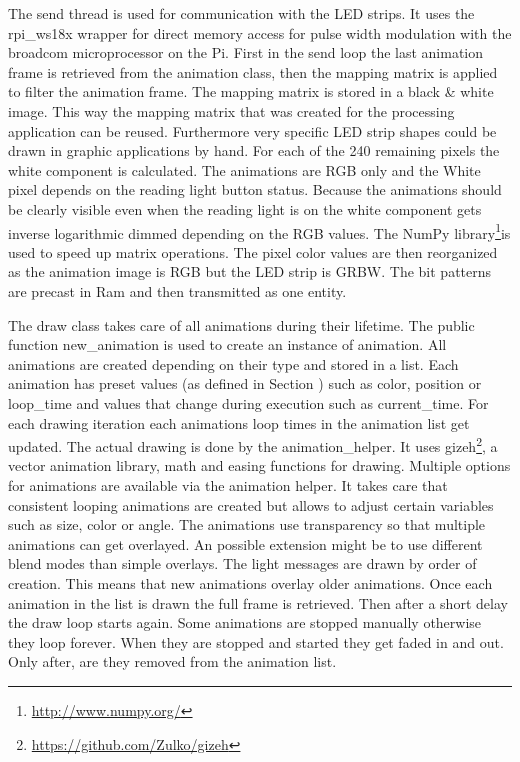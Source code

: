 The send thread is used for communication with the LED strips. It uses the rpi\_ws18x wrapper for direct memory access for pulse width modulation with the broadcom microprocessor on the Pi. First in the send loop the last animation frame is retrieved from the animation class, then the mapping matrix is applied to filter the animation frame. The mapping matrix is stored in a black \& white image. This way the mapping matrix that was created for the processing application can be reused. Furthermore very specific LED strip shapes could be drawn in graphic applications by hand. For each of the 240 remaining pixels the white component is calculated. The animations are RGB only and the White pixel depends on the reading light button status. Because the animations should be clearly visible even when the reading light is on the white component gets inverse logarithmic dimmed depending on the RGB values. The NumPy library\footnote{\url{http://www.numpy.org/}}is used to speed up matrix operations. The pixel color values are then reorganized as the animation image is RGB but the LED strip is GRBW. The bit patterns are precast in Ram and then transmitted as one entity. 

The draw class takes care of all animations during their lifetime. The public function new\_animation is used to create an instance of animation. All animations are created depending on their type and stored in a list. Each animation has preset values (as  defined in Section ) such as color, position or loop\_time and values that change during execution such as current\_time. For each drawing iteration each animations loop times in the animation list get updated. The actual drawing is done by the animation\_helper. It uses gizeh\footnote{\url{https://github.com/Zulko/gizeh}}, a vector animation library, math and easing functions for drawing. Multiple options for animations are available via the animation helper. It takes care that consistent looping animations are created but allows to adjust certain variables such as size, color or angle. The animations use transparency so that multiple animations can get overlayed. An possible extension might be to use different blend modes than simple overlays. The light messages are drawn by order of creation. This means that new animations overlay older animations. Once each animation in the list is drawn the full frame is retrieved. Then after a short delay the draw loop starts again. Some animations are stopped manually otherwise they loop forever. When they are stopped and started they get faded in and out. Only after, are they removed from the animation list. 

